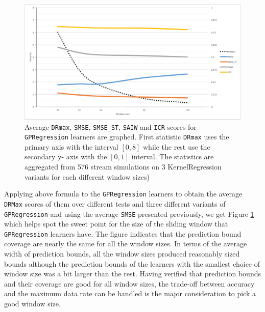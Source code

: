 \begin{figure}[htbp]
  \centering
    \includegraphics[width=\linewidth]{./Figures/gpreg_wsize_sweet_pt.pdf}
  \caption{Average \texttt{DRmax}, \texttt{SMSE}, \texttt{SMSE\_ST}, \texttt{SAIW} and \texttt{ICR} scores for \texttt{GPRegression} learners are graphed. First statistic \texttt{DRmax} uses the primary axis with the interval $[0,8]$ while the rest use the secondary y- axis with the $[0,1]$ interval. The statistics are aggregated from 576 stream simulations on 3 KernelRegression variants for each different window sizes)}
  \label{fig:gpreg_wsize_sweet_pt}
\end{figure}

Applying above formula to the \texttt{GPRegression} learners to obtain the average \texttt{DRMax} scores of them over different tests and three different variants of \texttt{GPRegression} and using the average \texttt{SMSE} presented previously, we get Figure \ref{fig:gpreg_wsize_sweet_pt} which helps spot the sweet point for the size of the sliding window that \texttt{GPRegression} learners have. The figure indicates that the prediction bound coverage are nearly the same for all the window sizes. In terms of the average width of prediction bounds, all the window sizes produced reasonably sized bounds although the prediction bounds of the learners with the smallest choice of window size was a bit larger than the rest. Having verified that prediction bounds and their coverage are good for all window sizes, the trade-off between accuracy and the maximum data rate can be handled is the major consideration to pick a good window size. 

